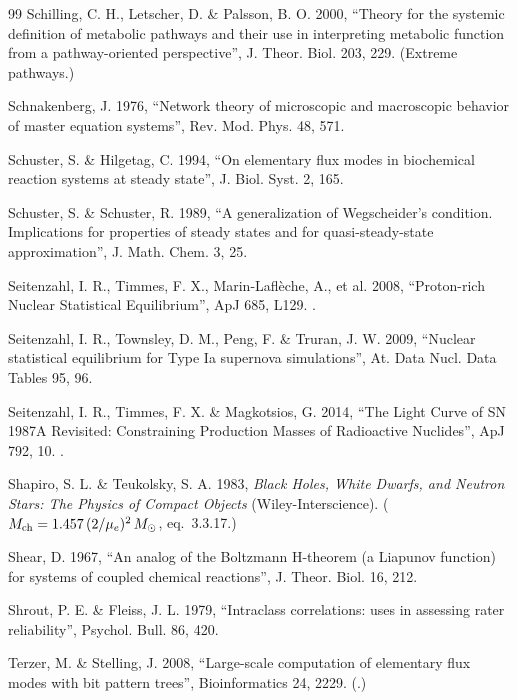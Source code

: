 \begin{thebibliography}{99}
Schilling, C. H., Letscher, D. \& Palsson, B. O. 2000, ``Theory for the systemic
definition of metabolic pathways and their use in interpreting metabolic
function from a pathway-oriented perspective'', J. Theor. Biol. 203, 229.
(Extreme pathways.)

Schnakenberg, J. 1976, ``Network theory of microscopic and macroscopic behavior
of master equation systems'', Rev. Mod. Phys. 48, 571.

Schuster, S. \& Hilgetag, C. 1994, ``On elementary flux modes in biochemical
reaction systems at steady state'', J. Biol. Syst. 2, 165.

Schuster, S. \& Schuster, R. 1989, ``A generalization of Wegscheider's
condition. Implications for properties of steady states and for
quasi-steady-state approximation'', J. Math. Chem. 3, 25.

Seitenzahl, I. R., Timmes, F. X., Marin-Lafl\`eche, A., et al. 2008,
``Proton-rich Nuclear Statistical Equilibrium'', ApJ 685, L129.
.

Seitenzahl, I. R., Townsley, D. M., Peng, F. \& Truran, J. W. 2009, ``Nuclear
statistical equilibrium for Type Ia supernova simulations'', At. Data Nucl.
Data Tables 95, 96.

Seitenzahl, I. R., Timmes, F. X. \& Magkotsios, G. 2014, ``The Light Curve of
SN 1987A Revisited: Constraining Production Masses of Radioactive Nuclides'',
ApJ 792, 10. .

Shapiro, S. L. \& Teukolsky, S. A. 1983, \emph{Black Holes, White Dwarfs, and
Neutron Stars: The Physics of Compact Objects} (Wiley-Interscience).
($M_{\mathrm{ch}} = 1.457\,(2/\mu_e)^2\,M_{\odot}$, eq.~3.3.17.)

Shear, D. 1967, ``An analog of the Boltzmann H-theorem (a Liapunov function)
for systems of coupled chemical reactions'', J. Theor. Biol. 16, 212.

Shrout, P. E. \& Fleiss, J. L. 1979, ``Intraclass correlations: uses in
assessing rater reliability'', Psychol. Bull. 86, 420.

Terzer, M. \& Stelling, J. 2008, ``Large-scale computation of elementary flux
modes with bit pattern trees'', Bioinformatics 24, 2229. (.)


\end{thebibliography}
